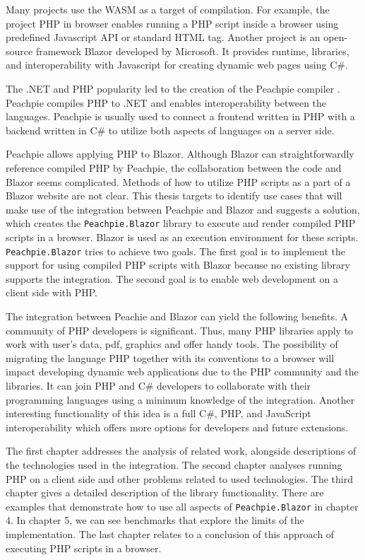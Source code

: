 \par
Many projects use the WASM as a target of compilation.
For example, the project PHP in browser \cite{online:pib} enables running a PHP script inside a browser using predefined Javascript API or standard HTML tag.
Another project is an open-source framework Blazor \cite{online:blazor} developed by Microsoft.
It provides runtime, libraries, and interoperability with Javascript for creating dynamic web pages using C\#.
\par
The .NET and PHP popularity led to the creation of the Peachpie compiler \cite{online:peachpie}.
Peachpie compiles PHP to .NET and enables interoperability between the languages.
Peachpie is usually used to connect a frontend written in PHP with a backend written in C\# to utilize both aspects of languages on a server side.
\par
Peachpie allows applying PHP to Blazor. 
Although Blazor can straightforwardly reference compiled PHP by Peachpie, the collaboration between the code and Blazor seems complicated.
Methods of how to utilize PHP scripts as a part of a Blazor website are not clear. 
This thesis targets to identify use cases that will make use of the integration between Peachpie and Blazor and suggests a solution, which creates the \texttt{Peachpie.Blazor} library  to execute and render compiled PHP scripts in a browser.
Blazor is used as an execution environment for these scripts.
\texttt{Peachpie.Blazor} tries to achieve two goals.
The first goal is to implement the support for using compiled PHP scripts with Blazor because no existing library supports the integration.
The second goal is to enable web development on a client side with PHP.
\par
The integration between Peachie and Blazor can yield the following benefits.
A community of PHP developers is significant.
Thus, many PHP libraries apply to work with user's data, pdf, graphics and offer handy tools.
The possibility of migrating the language PHP together with its conventions to a browser will impact developing dynamic web applications due to the PHP community and the libraries.
It can join PHP and C\# developers to collaborate with their programming languages using a minimum knowledge of the integration.
Another interesting functionality of this idea is a full C\#, PHP, and JavaScript interoperability which offers more options for developers and future extensions.
\par
The first chapter addresses the analysis of related work, alongside descriptions of the technologies used in the integration.
The second chapter analyses running PHP on a client side and other problems related to used technologies.
The third chapter gives a detailed description of the library functionality.
There are examples that demonstrate how to use all aspects of \texttt{Peachpie.Blazor} in chapter 4.
In chapter 5, we can see benchmarks that explore the limits of the implementation.
The last chapter relates to a conclusion of this approach of executing PHP scripts in a browser.
